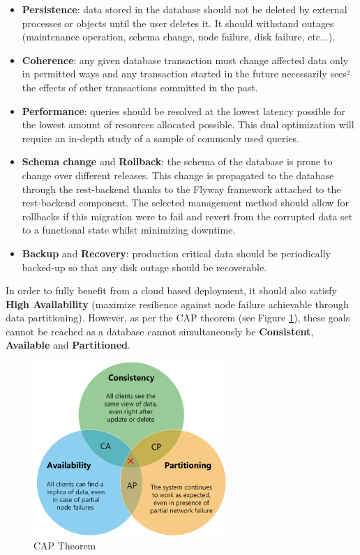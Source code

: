 \documentclass[11pt]{article}
\begin{document}
\begin{itemize}
    \item \textbf{Persistence}: data stored in the database should not be deleted by external processes or objects until the user deletes it. It should withstand outages (maintenance operation, schema change, node failure, disk failure, etc...).
    \item \textbf{Coherence}: any given database transaction must change affected data only in permitted ways and any transaction started in the future necessarily sees² the effects of other transactions committed in the past. 
    
    \item \textbf{Performance}: queries should be resolved at the lowest latency possible for the lowest amount of resources allocated possible. This dual optimization will require an in-depth study of a sample of commonly used queries.
    
    \item \textbf{Schema change} and \textbf{Rollback}: the schema of the database is prone to change over different releases. This change is propagated to the database through the rest-backend thanks to the Flyway framework attached to the rest-backend component. The selected management method should allow for rollbacks if this migration were to fail and revert from the corrupted data set to a functional state whilst minimizing downtime.
    
    \item \textbf{Backup} and \textbf{Recovery}: production critical data should be periodically backed-up so that any disk outage should be recoverable.
\end{itemize}  

\newpage
In order to fully benefit from a cloud based deployment, it should also satisfy \textbf{High Availability} (maximize resilience against node failure achievable through data partitioning). However, as per the CAP theorem (see Figure \ref{fig:vulas_cap}), these goals cannot be reached as a database cannot simultaneously be \textbf{Consistent}, \textbf{Available} and \textbf{Partitioned}.

\begin{figure}[h]
    \centering
    \includegraphics[width=0.65\textwidth]{vulas_CAP.png}
    \caption{CAP Theorem \cite{CAP}}
    \label{fig:vulas_cap}
\end{figure}
\end{document}

